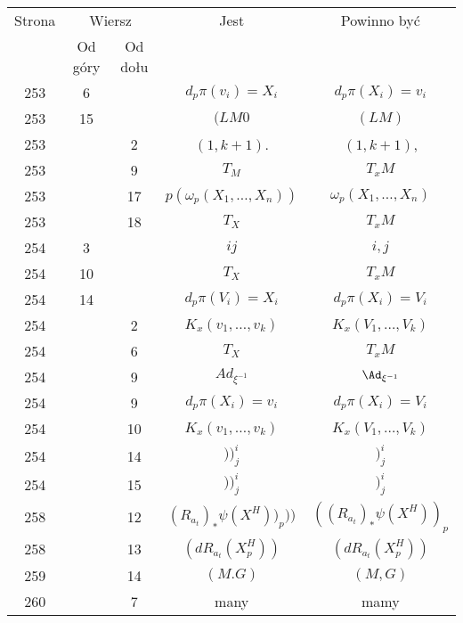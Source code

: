 \documentclass[a4paper,11pt]{article}
\numberwithin{equation}{section}
\begin{document}
\begin{center}
  \begin{tabular}{|c|c|c|c|c|}
    \hline
    Strona & \multicolumn{2}{c|}{Wiersz} & Jest
                              & Powinno być \\ \cline{2-3}
    & Od góry & Od dołu & & \\
    \hline
    253 & \hphantom{0}6 & & $d_{ p } \pi( v_{ i } ) = X_ { i }$
           & $d_{ p } \pi( X_{ i }) = v_ { i }$ \\
    253 & 15 & & $( LM 0$ & $( LM )$ \\
    253 & & \hphantom{0}2 & $( 1, k + 1 )$. & $( 1, k + 1 )$, \\
    253 & & \hphantom{0}9 & $T_{ M }$ & $T_{ x }M$ \\
    253 & & 17 & $p( \omega_{ p }( X_{ 1 }, \ldots, X_{ n } ) )$
           & $\omega_{ p }( X_{ 1 }, \ldots, X_{ n } )$ \\
    253 & & 18 & $T_{ X }$ & $T_{ x }M$ \\
    254 & \hphantom{0}3 & & $ij$ & $i, j$ \\
    254 & 10 & & $T_{ X }$ & $T_{ x }M$ \\
    254 & 14 & & $d_{ p } \pi( V_{ i } ) = X_{ i }$
    & $d_{ p } \pi( X_{ i } ) = V_{ i }$ \\
    254 & & \hphantom{0}2 & $K_{ x }( v_{ 1 }, \ldots, v_{ k } )$
    & $K_{ x }( V_{ 1 }, \ldots, V_{ k } )$ \\
    254 & & \hphantom{0}6 & $T_{ X }$ & $T_{ x }M$ \\
    254 & & \hphantom{0}9 & $Ad_{ \xi^{ -1 } }$ & $\Ad_{ \xi^{ -1 } }$ \\
    254 & & \hphantom{0}9 & $d_{ p } \pi( X_{ i } ) = v_{ i }$
           & $d_{ p } \pi( X_{ i } ) = V_{ i }$ \\
    254 & & 10 & $K_{ x }( v_{ 1 }, \ldots, v_{ k } )$
           & $K_{ x }( V_{ 1 }, \ldots, V_{ k } )$ \\
    254 & & 14 & $) )^{ i }_{ j }$ & $)^{ i }_{ j }$ \\
    254 & & 15 & $) )^{ i }_{ j }$ & $)^{ i }_{ j }$ \\
    258 & & 12 & $( R_{ a_{ t } } )_{ * } \psi( X^{ H } ) )_{ p } ) )$
           & $( ( R_{ a_{ t } } )_{ * } \psi( X^{ H } ) )_{ p }$ \\
    258 & & 13 & $( dR_{ a_{ t } }( X_{ p }^{ H } ) )$
           & $( dR_{ a_{ t } }( X_{ p }^{ H } ) )$ \\[0.5em]
    259 & & 14 & $( M. G )$ & $( M, G )$ \\
    260 & & \hphantom{0}7 & many & mamy \\

\end{tabular}
\end{center}
\end{document}

